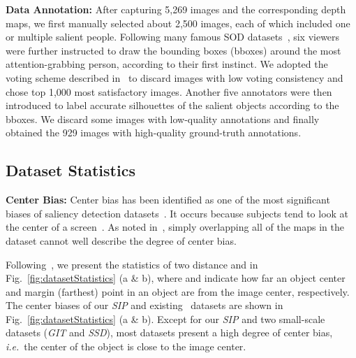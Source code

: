\documentclass[journal]{IEEEtran}
\def\ie{\emph{i.e.}}
\newcommand{\figref}[1]{Fig.~\ref{#1}}
\newcommand{\fdp}[1]{#1}
\begin{document}
\textbf{Data Annotation:}
After capturing 5,269 images and the corresponding depth maps,
we first manually selected about 2,500 images, each of which included
one or multiple salient people. Following many famous SOD
datasets~\cite{achanta2009frequency,alpert2007image,ChengPAMI15,
JointSalExist17,li2017instance,li2015visual,LiuSZTS07Learn,
2001iccvSOD,wang2017learning,xia2017and,yan2013hierarchical},
six viewers \fdp{were} further instructed to draw the bounding boxes (bboxes)
\fdp{around} the most attention-grabbing person, \fdp{according to their first instinct.}
We adopt\fdp{ed} the voting scheme described in~\cite{peng2014rgbd} to discard images
with low voting consistency and chose top 1,000 \fdp{most} satisfactory images.
Another five annotators \fdp{were then} introduced to label accurate silhouettes of the salient objects according to the bboxes. We discard some images with low-quality annotations and finally obtained the 929 images with high-quality ground-truth annotations.


\subsection{Dataset Statistics}\label{sec:datasetStatistics}

\textbf{Center Bias:}
Center bias has been identified
as one of the most significant bias\fdp{es} of saliency detection datasets~\cite{li2014secrets}.
It \fdp{occurs because} subjects \fdp{tend to} look at the center of \fdp{a} screen~\cite{tatler2005visual}.
As \fdp{noted} in~\cite{fan2018salient}, simply overlap\fdp{ping} all of the maps in the dataset
\fdp{cannot well} describe the degree of center bias.

Following~\cite{fan2018salient}, we present the
statistics of two distance  and  in \figref{fig:datasetStatistics} (a \& b),
where  and  indicate how far an object center and margin (farthest)
point in an object are from the image center, respectively.
The center bias\fdp{es} of our \emph{SIP} and existing~\cite{niu2012leveraging,
ciptadi2013depth,li2014saliency,cheng2014depth,peng2014rgbd,ju2014depth,zhu2017three} datasets
are shown in \figref{fig:datasetStatistics} (a \& b).
Except for our \emph{SIP} and two small-scale datasets (\emph{GIT} and \emph{SSD}),
most datasets present a high degree of center bias,
\ie~the center of the object is close to the image center.
\end{document}
